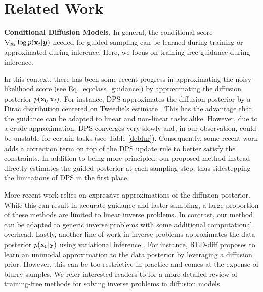 \section{Related Work}
\label{sec:related}
\textbf{Conditional Diffusion Models.} In general, the conditional score $\nabla_{{\mathbf{x}}_t} \log p({\mathbf{x}}_t|{\bm{y}})$ needed for guided sampling can be learned during training \citep{saharia2022palette,podell2023sdxl,rombach2022high} or approximated during inference. Here, we focus on training-free guidance during inference. 

In this context, there has been some recent progress in approximating the noisy likelihood score (see Eq. \ref{eq:class_guidance}) by approximating the diffusion posterior $p({\mathbf{x}}_0|{\mathbf{x}}_t)$. For instance, DPS \citep{chung2022diffusion} approximates the diffusion posterior by a Dirac distribution centered on Tweedie's estimate \citep{tweedie}. This has the advantage that the guidance can be adapted to linear and non-linear tasks alike. However, due to a crude approximation, DPS converges very slowly and, in our observation, could be unstable for certain tasks (see Table \ref{deblur}). Consequently, some recent work \citep{Yu_2023_ICCV, bansal2024universal} adds a correction term on top of the DPS update rule to better satisfy the constraints. In addition to being more principled, our proposed method instead directly estimates the guided posterior at each sampling step, thus sidestepping the limitations of DPS in the first place.

More recent work \citep{song2022pseudoinverse, pandey2024fast, pokle2024trainingfree, boys2023tweedie} relies on expressive approximations of the diffusion posterior. While this can result in accurate guidance and faster sampling, a large proportion of these methods are limited to linear inverse problems. In contrast, our method can be adapted to generic inverse problems with some additional computational overhead. Lastly, another line of work in inverse problems approximates the data posterior $p({\mathbf{x}}_0|{\mathbf{y}})$ using variational inference \citep{zhang2018advances}. For instance, RED-diff \citep{mardani2023variational} proposes to learn an unimodal approximation to the data posterior by leveraging a diffusion prior. However, this can be too restrictive in practice and comes at the expense of blurry samples. We refer interested readers to \citet{daras2024surveydiffusionmodelsinverse} for a more detailed review of training-free methods for solving inverse problems in diffusion models.


